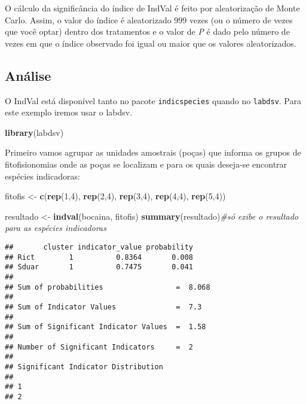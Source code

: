 \documentclass[
]{book}
\newenvironment{Shaded}{\begin{snugshade}}{\end{snugshade}}
\newcommand{\CommentTok}[1]{\textcolor[rgb]{0.56,0.35,0.01}{\textit{#1}}}
\newcommand{\DecValTok}[1]{\textcolor[rgb]{0.00,0.00,0.81}{#1}}
\newcommand{\KeywordTok}[1]{\textcolor[rgb]{0.13,0.29,0.53}{\textbf{#1}}}
\newcommand{\NormalTok}[1]{#1}
\newcommand{\StringTok}[1]{\textcolor[rgb]{0.31,0.60,0.02}{#1}}
\begin{document}
O cálculo da significância do índice de IndVal é feito por aleatorização de Monte Carlo. Assim, o valor do índice é aleatorizado 999 vezes (ou o número de vezes que você optar) dentro dos tratamentos e o valor de \emph{P} é dado pelo número de vezes em que o índice observado foi igual ou maior que os valores aleatorizados.

\hypertarget{anuxe1lise-2}{%
\subsection{Análise}\label{anuxe1lise-2}}

O IndVal está disponível tanto no pacote \texttt{indicspecies} quando no \texttt{labdsv}. Para este exemplo iremos usar o labdsv.

\begin{Shaded}
\begin{Highlighting}[]
\KeywordTok{library}\NormalTok{(labdsv)}
\end{Highlighting}
\end{Shaded}

Primeiro vamos agrupar as unidades amostrais (poças) que informa os grupos de fitofisionomias onde as poças se localizam e para os quais deseja-se encontrar espécies indicadoras:

\begin{Shaded}
\begin{Highlighting}[]
\NormalTok{fitofis <-}\StringTok{ }\KeywordTok{c}\NormalTok{(}\KeywordTok{rep}\NormalTok{(}\DecValTok{1}\NormalTok{,}\DecValTok{4}\NormalTok{), }\KeywordTok{rep}\NormalTok{(}\DecValTok{2}\NormalTok{,}\DecValTok{4}\NormalTok{), }\KeywordTok{rep}\NormalTok{(}\DecValTok{3}\NormalTok{,}\DecValTok{4}\NormalTok{), }\KeywordTok{rep}\NormalTok{(}\DecValTok{4}\NormalTok{,}\DecValTok{4}\NormalTok{), }\KeywordTok{rep}\NormalTok{(}\DecValTok{5}\NormalTok{,}\DecValTok{4}\NormalTok{))}
\end{Highlighting}
\end{Shaded}

\begin{Shaded}
\begin{Highlighting}[]
\NormalTok{resultado <-}\StringTok{ }\KeywordTok{indval}\NormalTok{(bocaina, fitofis)}
\KeywordTok{summary}\NormalTok{(resultado)}\CommentTok{#só exibe o resultado para as espécies indicadoras}
\end{Highlighting}
\end{Shaded}

\begin{verbatim}
##       cluster indicator_value probability
## Rict        1          0.8364       0.008
## Sduar       1          0.7475       0.041
## 
## Sum of probabilities                 =  8.068 
## 
## Sum of Indicator Values              =  7.3 
## 
## Sum of Significant Indicator Values  =  1.58 
## 
## Number of Significant Indicators     =  2 
## 
## Significant Indicator Distribution
## 
## 1 
## 2
\end{verbatim}
\end{document}
